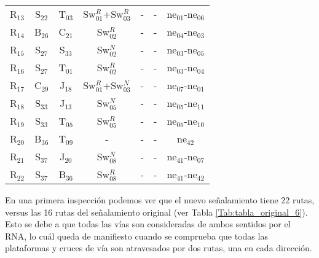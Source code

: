 \begin{table}[H]
{\begin{center}
{\begin{tabular}{ c c c c c c c }
                    R$_{13}$  & S$_{22}$ & T$_{03}$ & Sw$_{01}^{R}$+Sw$_{03}^{R}$ & - & - & ne$_{01}$-ne$_{06}$\\
                    R$_{14}$  & B$_{26}$ & C$_{21}$ & Sw$_{02}^{R}$ & - & - & ne$_{04}$-ne$_{03}$\\
                    R$_{15}$  & S$_{27}$ & S$_{33}$ & Sw$_{02}^{N}$ & - & - & ne$_{03}$-ne$_{05}$\\
                    R$_{16}$  & S$_{27}$ & T$_{01}$ & Sw$_{02}^{R}$ & - & - & ne$_{03}$-ne$_{04}$\\
                    R$_{17}$  & C$_{29}$ & J$_{18}$ & Sw$_{01}^{R}$+Sw$_{03}^{N}$ & - & - & ne$_{07}$-ne$_{01}$\\
                    R$_{18}$  & S$_{33}$ & J$_{13}$ & Sw$_{05}^{N}$ & - & - & ne$_{05}$-ne$_{11}$\\
                    R$_{19}$  & S$_{33}$ & T$_{05}$ & Sw$_{05}^{R}$ & - & - & ne$_{05}$-ne$_{10}$\\
                    R$_{20}$  & B$_{36}$ & T$_{09}$ & - & - & - & ne$_{42}$\\
                    R$_{21}$  & S$_{37}$ & J$_{20}$ & Sw$_{08}^{N}$ & - & - & ne$_{41}$-ne$_{07}$\\
                    R$_{22}$  & S$_{37}$ & B$_{36}$ & Sw$_{08}^{R}$ & - & - & ne$_{41}$-ne$_{42}$\\
                \hline
            \end{tabular}
        }
        \end{center}
     }
    \end{table}
    
    En una primera inspección podemos ver que el nuevo señalamiento tiene 22 rutas, versus las 16 rutas del señalamiento original (ver Tabla \ref{Tab:tabla_original_6}). Esto se debe a que todas las vías son consideradas de ambos sentidos por el RNA, lo cuál queda de manifiesto cuando se comprueba que todas las plataformas y cruces de vía son atravesados por dos rutas, una en cada dirección. 